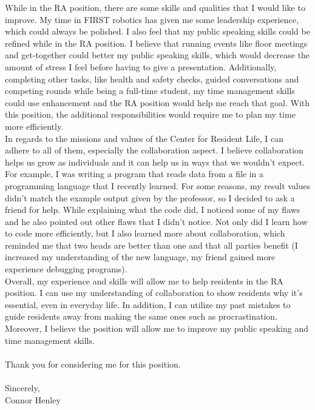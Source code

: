\documentclass[line,margin]{res}
\begin{document}
\begin{resume}
\begin{adjustwidth}{-92pt}{0pt}
\hspace{20pt}While in the RA position, there are some skills and qualities that I would like to improve. My time in FIRST robotics has given me some leadership experience, which could always be polished. I also feel that my public speaking skills could be refined while in the RA position. I believe that running events like floor meetings and get-together could better my public speaking skills, which would decrease the amount of stress I feel before having to give a presentation. Additionally, completing other tasks, like health and safety checks, guided conversations and competing rounds while being a full-time student, my time management skills could use enhancement and the RA position would help me reach that goal. With this position, the additional responsibilities would require me to plan my time more efficiently.\\

\hspace{20pt}In regards to the missions and values of the Center for Resident Life, I can adhere to all of them, especially the collaboration aspect. I believe collaboration helps us grow as individuals and it can help us in ways that we wouldn’t expect. For example, I was writing a program that reads data from a file in a programming language that I recently learned. For some reasons, my result values didn’t match the example output given by the professor, so I decided to ask a friend for help. While explaining what the code did, I noticed some of my flaws and he also pointed out other flaws that I didn’t notice. Not only did I learn how to code more efficiently, but I also learned more about collaboration, which reminded me that two heads are better than one and that all parties benefit (I increased my understanding of the new language, my friend gained more experience debugging programs). \\

\hspace{20pt}Overall, my experience and skills will allow me to help residents in the RA position. I can use my understanding of collaboration to show residents why it’s essential, even in everyday life. In addition, I can utilize my past mistakes to guide residents away from making the same ones such as procrastination.  Moreover, I believe the position will allow me to improve my public speaking and time management skills. 
\\
\\
Thank you for considering me for this position.
\\
\\
Sincerely,
\\
Connor Henley
\end{adjustwidth}
\end{resume}
\end{document}
